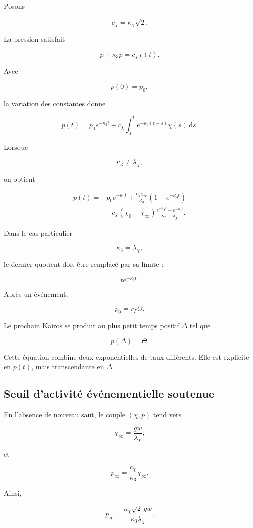 Posons

\[
c_\chi
=
\kappa_\chi\sqrt2.
\]

La pression satisfait

\[
\dot p+\kappa_3p=c_\chi\chi(t).
\]

Avec

\[
p(0)=p_0,
\]

la variation des constantes donne

\[
p(t)
=
p_0e^{-\kappa_3t}
+
c_\chi
\int_0^t
e^{-\kappa_3(t-s)}
\chi(s)
\,\mathrm ds.
\]

Lorsque

\[
\kappa_3\neq\lambda_\chi,
\]

on obtient

\[
\boxed{
\begin{aligned}
p(t)
={}&
p_0e^{-\kappa_3t}
+
\frac{c_\chi\chi_\infty}{\kappa_3}
\left(
1-e^{-\kappa_3t}
\right)
\\
&+
c_\chi
\left(
\chi_0-\chi_\infty
\right)
\frac{
e^{-\lambda_\chi t}
-
e^{-\kappa_3t}
}{
\kappa_3-\lambda_\chi
}.
\end{aligned}
}
\]

Dans le cas particulier

\[
\kappa_3=\lambda_\chi,
\]

le dernier quotient doit être remplacé par sa limite :

\[
te^{-\kappa_3t}.
\]

Après un événement,

\[
p_0=r_P\Theta.
\]

Le prochain Kairos se produit au plus petit temps positif
\(\Delta\) tel que

\[
p(\Delta)=\Theta.
\]

Cette équation combine deux exponentielles de taux différents. Elle
est explicite en \(p(t)\), mais transcendante en \(\Delta\).

\subsection{Seuil d'activité événementielle soutenue}
\label{annexe-r2-gk}

En l'absence de nouveau saut, le couple \((\chi,p)\) tend vers

\[
\chi_\infty
=
\frac{gw}{\lambda_\chi},
\]

et

\[
p_\infty
=
\frac{c_\chi}{\kappa_3}\chi_\infty.
\]

Ainsi,

\[
p_\infty
=
\frac{
\kappa_\chi\sqrt2\,gw
}{
\kappa_3\lambda_\chi
}.
\]

